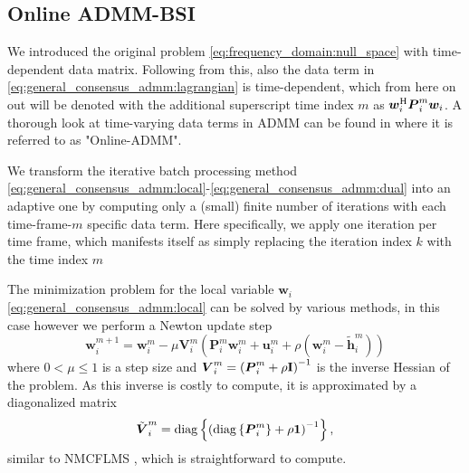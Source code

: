 \documentclass{article}
\newcommand{\hf}{{\bm{h}}}
\newcommand{\wf}{{\bm{w}}}
\newcommand{\uuf}{{\bm{u}}}
\newcommand{\aRhof}{{\bm{{P}}}}
\newcommand{\I}{\mtxb{I}}
\begin{document}
\subsection{Online ADMM-BSI}
\label{ssec:online_admm}
We introduced the original problem \eqref{eq:frequency_domain:null_space} with time-dependent data matrix. Following from this, also the data term in \eqref{eq:general_consensus_admm:lagrangian} is time-dependent, which from here on out will be denoted with the additional superscript time index \(m\) as \(\wf_i^\herm \aRhof_i^{m} \wf_i\).
A thorough look at time-varying data terms in ADMM can be found in \cite{wangOnlineAlternatingDirection2013,hosseiniOnlineDistributedADMM2014} where it is referred to as "Online-ADMM".

We transform the iterative batch processing method \eqref{eq:general_consensus_admm:local}-\eqref{eq:general_consensus_admm:dual} into an adaptive one by computing only a (small) finite number of iterations with each time-frame-\(m\) specific data term.
Here specifically, we apply one iteration per time frame, which manifests itself as simply replacing the iteration index \(k\) with the time index \(m\)

The minimization problem for the local variable \(\wf_i\) \eqref{eq:general_consensus_admm:local} can be solved by various methods, in this case however we perform a Newton update step
\begin{equation}
    \wf_i^{m+1} = \wf_i^{m} - \mu \bm{{V}}_i^m \left( \aRhof_i^m \wf_i^m + \uuf_i^m + \rho\left(\wf_i^m - \tilde{\hf}_i^{m}\right)\right)\label{eq:online_admm:local_update}
\end{equation}
where \(0  < \mu\leq 1\) is a step size and \(\bm{{V}}_i^m = \left(\aRhof_i^m + \rho \I \right)^{-1}\) is the inverse Hessian of the problem.
As this inverse is costly to compute, it is approximated by a diagonalized matrix
\begin{equation}
    \tilde{\bm{{V}}}_i^m = \operatorname{diag} \left\{ \left( \operatorname{diag} \left\{ \aRhof_i^m \right\} + \rho \mtxb{1} \right)^{-1}\right\},
\end{equation}
similar to NMCFLMS \cite{huangClassFrequencydomainAdaptive2003}, which is straightforward to compute.
\end{document}
